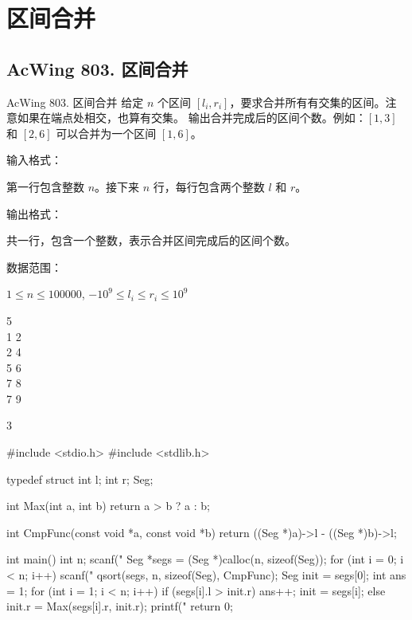 \section{区间合并}

\subsection{AcWing 803. 区间合并}
\begin{titledbox}{AcWing 803. 区间合并}
    给定 $n$ 个区间 $[l_i, r_i]$，要求合并所有有交集的区间。注意如果在端点处相交，也算有交集。
    输出合并完成后的区间个数。例如：$[1,3]$ 和 $[2,6]$ 可以合并为一个区间 $[1,6]$。

    输入格式：

    第一行包含整数 $n$。接下来 $n$ 行，每行包含两个整数 $l$ 和 $r$。

    输出格式：

    共一行，包含一个整数，表示合并区间完成后的区间个数。

    数据范围：

    $1 \le n \le 100000$, $-10^9 \le l_i \le r_i \le 10^9$

    \begin{inputblock}
        5 \\
        1 2 \\
        2 4 \\
        5 6 \\
        7 8 \\
        7 9
    \end{inputblock}
    \begin{outputblock}
        3
    \end{outputblock}
\end{titledbox}

\begin{mycpptwocol}[区间合并]
    #include <stdio.h>
    #include <stdlib.h>

    typedef struct {
        int l;
        int r;
    } Seg;

    int Max(int a, int b)
        {
        return a > b ? a : b;
    }

    int CmpFunc(const void *a, const void *b)
        {
        return ((Seg *)a)->l - ((Seg *)b)->l;
    }

    int main()
        {
        int n;
        scanf("%
        Seg *segs = (Seg *)calloc(n, sizeof(Seg));
        for (int i = 0; i < n; i++) {
            scanf("%
        }
        qsort(segs, n, sizeof(Seg), CmpFunc);
        Seg init = segs[0];
        int ans = 1;
        for (int i = 1; i < n; i++) {
            if (segs[i].l > init.r) {
                ans++;
                init = segs[i];
            } else {
                init.r = Max(segs[i].r, init.r);
            }
        }
        printf("%
        return 0;
    }
\end{mycpptwocol}